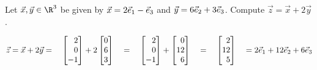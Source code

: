 \begin{example}
	Let $\vec x,\vec y\in\R^3$ be given by $\vec x=2{\vec e_1}-{\vec e_3}$ and $\vec y=6{\vec e_2}+3{\vec e_3}$.
	Compute $\vec z=\vec x+2\vec y$.

	\[
		\vec z=\vec x+2\vec y=\quad\mat{2\\0\\-1}+2\mat{0\\6\\3}\quad
		=\quad\mat{2\\0\\-1}+\mat{0\\12\\6}\quad=\quad\mat{2\\12\\5}\quad=2\xhat+12\yhat+6\zhat
	\]
\end{example}
